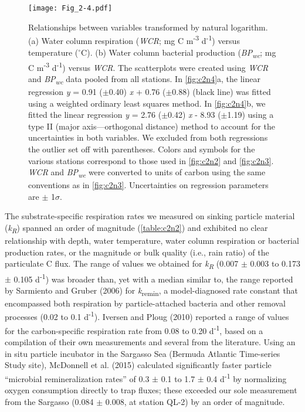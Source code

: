 \begin{SCfigure}[0.7][!t]
\centering
\texttt{[image: Fig\_2-4.pdf]}
\caption[Relationships between variables transformed by natural logarithm.]{Relationships between variables transformed by natural logarithm. (a) Water column respiration (\emph{WCR}; mg C m\textsuperscript{-3} d\textsuperscript{-1}) versus temperature ($^{\circ}$C). (b) Water column bacterial production (\emph{BP\textsubscript{wc}}; mg C m\textsuperscript{-3} d\textsuperscript{-1}) versus \emph{WCR}. The scatterplots were created using \emph{WCR} and \emph{BP\textsubscript{wc}} data pooled from all stations. In \autoref{fig:c2n4}a, the linear regression \emph{y} = 0.91 ($\pm$0.40) \emph{x} + 0.76 ($\pm$0.88) (black line) was fitted using a weighted ordinary least squares method. In \autoref{fig:c2n4}b, we fitted the linear regression \emph{y} = 2.76 ($\pm$0.42) \emph{x}  - 8.93 ($\pm$1.19) using a type II (major axis---orthogonal distance) method to account for the uncertainties in both variables. We excluded from both regressions the outlier set off with parentheses. Colors and symbols for the various stations correspond to those used in \autoref{fig:c2n2} and \autoref{fig:c2n3}. \emph{WCR} and \emph{BP\textsubscript{wc}} were converted to units of carbon using the same conventions as in \autoref{fig:c2n3}. Uncertainties on regression parameters are $\pm$ 1$\sigma$.}
\label{fig:c2n4}
\end{SCfigure}

The substrate-specific respiration rates we measured on sinking particle material (\emph{k\textsubscript{R}}) spanned an order of magnitude (\autoref{table:c2n2}) and exhibited no clear relationship with depth, water temperature, water column respiration or bacterial production rates, or the magnitude or bulk quality (i.e., rain ratio) of the particulate C flux. The range of values we obtained for \emph{k\textsubscript{R}} (0.007 $\pm$ 0.003 to 0.173 $\pm$ 0.105 d\textsuperscript{-1}) was broader than, yet with a median similar to, the range reported by Sarmiento and Gruber (2006) for \emph{k}\textsubscript{remin}, a model-diagnosed rate constant that encompassed both respiration by particle-attached bacteria and other removal processes (0.02 to 0.1 d\textsuperscript{-1}). Iversen and Ploug (2010) reported a range of values for the carbon-specific respiration rate from 0.08 to 0.20 d\textsuperscript{-1}, based on a compilation of their own measurements and several from the literature. Using an in situ particle incubator in the Sargasso Sea (Bermuda Atlantic Time-series Study site), McDonnell et al. (2015) calculated significantly faster particle ``microbial remineralization rates'' of 0.3 $\pm$ 0.1 to 1.7 $\pm$ 0.4 d\textsuperscript{-1} by normalizing oxygen consumption directly to trap fluxes; these exceeded our sole measurement from the Sargasso (0.084 $\pm$ 0.008, at station QL-2) by an order of magnitude.

